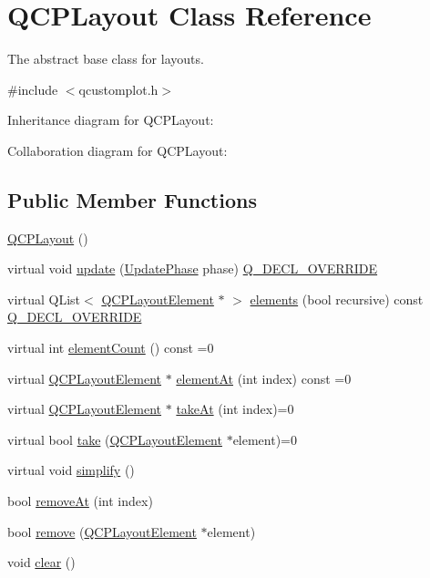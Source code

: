 \hypertarget{class_q_c_p_layout}{}\section{Q\+C\+P\+Layout Class Reference}
\label{class_q_c_p_layout}


The abstract base class for layouts.  




{\ttfamily \#include $<$qcustomplot.\+h$>$}



Inheritance diagram for Q\+C\+P\+Layout\+:


Collaboration diagram for Q\+C\+P\+Layout\+:
\subsection*{Public Member Functions}
\begin{DoxyCompactItemize}
\item 
\hyperlink{class_q_c_p_layout_a04222e6e1361fd802d48f1a25b7020d4}{Q\+C\+P\+Layout} ()
\item 
virtual void \hyperlink{class_q_c_p_layout_a48ecc9c98ea90b547c3e27a931a8f7bd}{update} (\hyperlink{class_q_c_p_layout_element_a0d83360e05735735aaf6d7983c56374d}{Update\+Phase} phase) \hyperlink{qcustomplot_8h_a42cc5eaeb25b85f8b52d2a4b94c56f55}{Q\+\_\+\+D\+E\+C\+L\+\_\+\+O\+V\+E\+R\+R\+I\+DE}
\item 
virtual Q\+List$<$ \hyperlink{class_q_c_p_layout_element}{Q\+C\+P\+Layout\+Element} $\ast$ $>$ \hyperlink{class_q_c_p_layout_aca129722c019f91d3367046f80abfa77}{elements} (bool recursive) const \hyperlink{qcustomplot_8h_a42cc5eaeb25b85f8b52d2a4b94c56f55}{Q\+\_\+\+D\+E\+C\+L\+\_\+\+O\+V\+E\+R\+R\+I\+DE}
\item 
virtual int \hyperlink{class_q_c_p_layout_a39d3e9ef5d9b82ab1885ba1cb9597e56}{element\+Count} () const =0
\item 
virtual \hyperlink{class_q_c_p_layout_element}{Q\+C\+P\+Layout\+Element} $\ast$ \hyperlink{class_q_c_p_layout_afa73ca7d859f8a3ee5c73c9b353d2a56}{element\+At} (int index) const =0
\item 
virtual \hyperlink{class_q_c_p_layout_element}{Q\+C\+P\+Layout\+Element} $\ast$ \hyperlink{class_q_c_p_layout_a5a79621fa0a6eabb8b520cfc04fb601a}{take\+At} (int index)=0
\item 
virtual bool \hyperlink{class_q_c_p_layout_ada26cd17e56472b0b4d7fbbc96873e4c}{take} (\hyperlink{class_q_c_p_layout_element}{Q\+C\+P\+Layout\+Element} $\ast$element)=0
\item 
virtual void \hyperlink{class_q_c_p_layout_a41e6ac049143866e8f8b4964efab01b2}{simplify} ()
\item 
bool \hyperlink{class_q_c_p_layout_a2403f684fee3ce47132faaeed00bb066}{remove\+At} (int index)
\item 
bool \hyperlink{class_q_c_p_layout_a6c58f537d8086f352576ab7c5b15d0bc}{remove} (\hyperlink{class_q_c_p_layout_element}{Q\+C\+P\+Layout\+Element} $\ast$element)
\item 
void \hyperlink{class_q_c_p_layout_a02883bdf2769b5b227f0232dba1ac4ee}{clear} ()
\end{DoxyCompactItemize}
